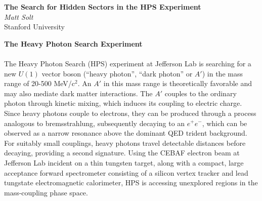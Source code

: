 \documentclass[12pt]{article}
\begin{document}
	\begin{center}
		\textbf{The Search for Hidden Sectors in the HPS Experiment} \\
		\emph{Matt Solt}				            \\
		Stanford University    	\\
	\end{center}

    \textbf{The Heavy Photon Search Experiment} \\
    \\
    	The Heavy Photon Search (HPS) experiment at Jefferson Lab is searching 
    for a new $U(1)$ vector boson (``heavy photon'', ``dark photon'' or $A'$)
    in the mass range of 20-500 MeV/c$^{2}$. An $A'$ in this mass range is
    theoretically favorable and may also mediate dark matter interactions.  
    The $A'$ couples to the ordinary photon through kinetic mixing, which 
    induces its coupling to electric charge. Since heavy photons couple to
    electrons, they can be produced through a process analogous to 
    bremsstrahlung, subsequently decaying to an $e^{+}e^{-}$, which can be
    observed as a narrow resonance above the dominant QED trident background.
    For suitably small couplings, heavy photons travel detectable distances
    before decaying, providing a second signature. Using the CEBAF electron
    beam at Jefferson Lab incident on a thin tungsten target, along with a 
    compact, large acceptance forward spectrometer consisting of a silicon
    vertex tracker and lead tungstate electromagnetic calorimeter, HPS is 
    accessing unexplored regions in the mass-coupling phase space. \\
    \\
\end{document}
